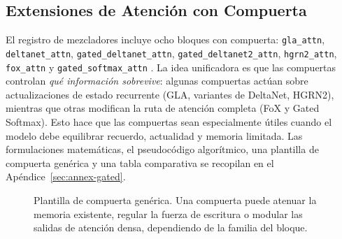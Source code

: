 \subsection{Extensiones de Atención con Compuerta}
El registro de mezcladores incluye ocho bloques con compuerta: \texttt{gla\_attn}, \texttt{deltanet\_attn}, \texttt{gated\_deltanet\_attn}, \texttt{gated\_deltanet2\_attn}, \texttt{hgrn2\_attn}, \texttt{fox\_attn} y \texttt{gated\_softmax\_attn} \citep{yang_gla_2023,yang_deltanet_2024,yang_gated_deltanet_2024,hatamizadeh_gated_deltanet2_2026,qin_hgrn2_2024,lin_forgetting_transformer_2025,qiu_gated_attention_2025}. La idea unificadora es que las compuertas controlan \emph{qué información sobrevive}: algunas compuertas actúan sobre actualizaciones de estado recurrente (GLA, variantes de DeltaNet, HGRN2), mientras que otras modifican la ruta de atención completa (FoX y Gated Softmax). Esto hace que las compuertas sean especialmente útiles cuando el modelo debe equilibrar recuerdo, actualidad y memoria limitada. Las formulaciones matemáticas, el pseudocódigo algorítmico, una plantilla de compuerta genérica y una tabla comparativa se recopilan en el Apéndice~\ref{sec:annex-gated}.

\begin{figure}[t]
\centering
{}
\caption{Plantilla de compuerta genérica. Una compuerta puede atenuar la memoria existente, regular la fuerza de escritura o modular las salidas de atención densa, dependiendo de la familia del bloque.}
\label{fig:gating-template}
\end{figure}